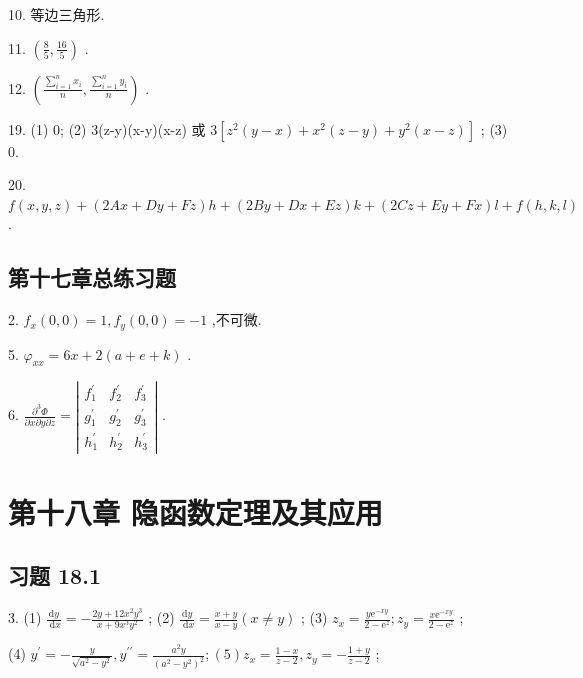 10. 等边三角形.

11. \(\left( {\frac{8}{5},\frac{16}{5}}\right)\) .

12. \(\left( {\frac{\mathop{\sum }\limits_{{i = 1}}^{n}{x}_{i}}{n},\frac{\mathop{\sum }\limits_{{i = 1}}^{n}{y}_{i}}{n}}\right)\) .

19. (1) 0; (2) 3(z-y)(x-y)(x-z) 或 \(3\left\lbrack  {{z}^{2}\left( {y - x}\right)  + {x}^{2}\left( {z - y}\right)  + {y}^{2}\left( {x - z}\right) }\right\rbrack\) ; (3) 0.

20. \(f\left( {x,y,z}\right)  + \left( {{2Ax} + {Dy} + {Fz}}\right) h + \left( {{2By} + {Dx} + {Ez}}\right) k + \left( {{2Cz} + {Ey} + {Fx}}\right) l + f\left( {h,k,l}\right)\) .

\subsection{第十七章总练习题}

2. \({f}_{x}\left( {0,0}\right)  = 1,{f}_{y}\left( {0,0}\right)  =  - 1\) ,不可微.

5. \({\varphi }_{xx} = {6x} + 2\left( {a + e + k}\right)\) .

6. \(\frac{{\partial }^{3}\Phi }{\partial x\partial y\partial z} = \left| \begin{array}{lll} {f}_{1}^{\prime } & {f}_{2}^{\prime } & {f}_{3}^{\prime } \\  {g}_{1}^{\prime } & {g}_{2}^{\prime } & {g}_{3}^{\prime } \\  {h}_{1}^{\prime } & {h}_{2}^{\prime } & {h}_{3}^{\prime } \end{array}\right|\) .



\section{第十八章 隐函数定理及其应用}

\subsection{习题 18.1}

3. (1) \(\frac{\mathrm{d}y}{\mathrm{\;d}x} =  - \frac{{2y} + {12}{x}^{2}{y}^{3}}{x + 9{x}^{3}{y}^{2}}\) ; (2) \(\frac{\mathrm{d}y}{\mathrm{\;d}x} = \frac{x + y}{x - y}\left( {x \neq  y}\right)\) ; (3) \({z}_{x} = \frac{y{\mathrm{e}}^{-{xy}}}{2 - {\mathrm{e}}^{z}};{z}_{y} = \frac{x{\mathrm{e}}^{-{xy}}}{2 - {\mathrm{e}}^{z}}\) ;

(4) \({y}^{\prime } =  - \frac{y}{\sqrt{{a}^{2} - {y}^{2}}},{y}^{\prime \prime } = \frac{{a}^{2}y}{{\left( {a}^{2} - {y}^{2}\right) }^{2}};\left( 5\right) {z}_{x} = \frac{1 - x}{z - 2},{z}_{y} =  - \frac{1 + y}{z - 2}\) ;

